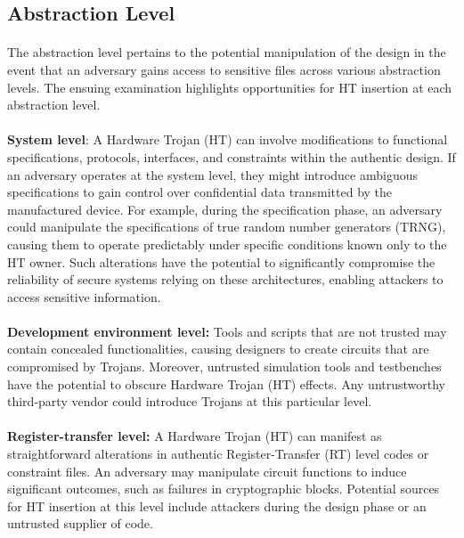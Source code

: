 \subsection{ Abstraction Level}
\paragraph*{}
The abstraction level pertains to the potential manipulation of the design in the event that an adversary gains access to sensitive files across various abstraction levels. The ensuing examination highlights opportunities for HT insertion at each abstraction level.
\paragraph*{}
\textbf{System level}: A Hardware Trojan (HT) can involve modifications to functional specifications, protocols, interfaces, and constraints within the authentic design. If an adversary operates at the system level, they might introduce ambiguous specifications to gain control over confidential data transmitted by the manufactured device. For example, during the specification phase, an adversary could manipulate the specifications of true random number generators (TRNG), causing them to operate predictably under specific conditions known only to the HT owner. Such alterations have the potential to significantly compromise the reliability of secure systems relying on these architectures, enabling attackers to access sensitive information.
\paragraph*{}
\textbf{Development environment level:} Tools and scripts that are not trusted may contain concealed functionalities, causing designers to create circuits that are compromised by Trojans. Moreover, untrusted simulation tools and testbenches have the potential to obscure Hardware Trojan (HT) effects. Any untrustworthy third-party vendor could introduce Trojans at this particular level. 
\paragraph*{}
\textbf{Register-transfer level:} A Hardware Trojan (HT) can manifest as straightforward alterations in authentic Register-Transfer (RT) level codes or constraint files. An adversary may manipulate circuit functions to induce significant outcomes, such as failures in cryptographic blocks. Potential sources for HT insertion at this level include attackers during the design phase or an untrusted supplier of code.
